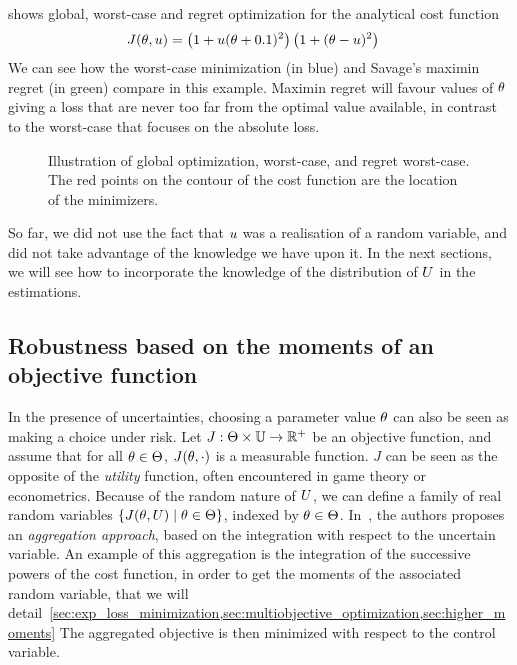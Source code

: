 \documentclass[../../Main_ManuscritThese.tex]{subfiles}
\newcommand\imgpath{/home/victor/acadwriting/Manuscrit/Text/Chapter3/img/}
\begin{document}
\begin{example}
 shows global, worst-case and regret optimization for the analytical cost function
\begin{align}
  \label{eq:decision_under_unc}
  J(\theta, u) &= \left(1 + u(\theta + 0.1)^2\right)\left(1 + (\theta - u)^2\right)
\end{align}
We can see how the worst-case minimization (in blue) and Savage's maximin regret (in green) compare in this example. Maximin regret will favour values of $\theta$ giving a loss that are never too far from the optimal value available, in contrast to the worst-case that focuses on the absolute loss.
\end{example}

\begin{figure}[ht]
  \centering
  
  \caption{\label{fig:decision_under_uncertainty} Illustration of global optimization, worst-case, and regret worst-case. The red points on the contour of the cost function are the location of the minimizers.}
\end{figure}

So far, we did not use the fact that $u$ was a realisation of a random variable, and did not take advantage of the knowledge we have upon it. In the next sections, we will see how to incorporate the knowledge of the distribution of $U$ in the estimations.

\subsection{Robustness based on the moments of an objective function}
In the presence of uncertainties, choosing a parameter value $\theta$ can also be seen as making a choice under risk. Let $J:\Theta \times \mathbb{U}\rightarrow \mathbb{R}^+$ be an objective function, and assume that for all $\theta \in \Theta$, $J(\theta, \cdot)$ is a measurable function.
$J$ can be seen as the opposite of the \emph{utility} function, often encountered in game theory or econometrics.
Because of the random nature of $U$, we can define a family of real random variables $\{J(\theta,U) \mid \theta \in \Theta\}$, indexed by $\theta \in \Theta$.
In~\cite{beyer_robust_2007}, the authors proposes an \emph{aggregation approach}, based on the integration with respect to the uncertain variable.
An example of this aggregation is the integration of the successive powers of the cost function, in order to get the moments of the associated random variable, that we will detail~\cref{sec:exp_loss_minimization,sec:multiobjective_optimization,sec:higher_moments} %
 The aggregated objective is then minimized with respect to the control variable.
\end{document}

